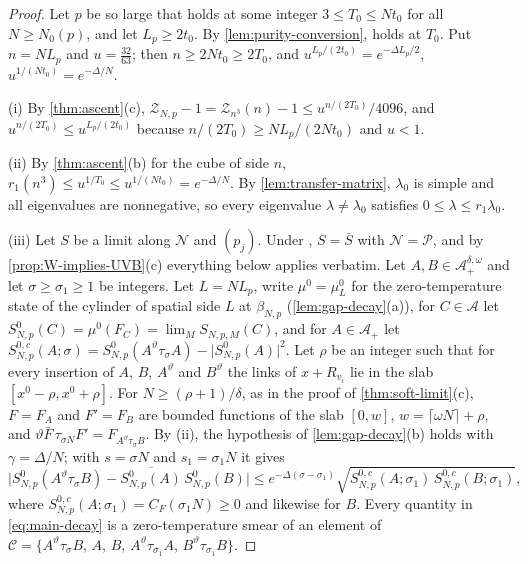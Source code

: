 \documentclass[11pt,a4paper]{amsart}
\theoremstyle{definition}
\theoremstyle{remark}
\numberwithin{equation}{section}
\newcommand{\abs}[1]{\lvert #1\rvert}      %
\newcommand{\TT}{\mathbb{T}}               %
\newcommand{\Zc}{\mathcal{Z}}              %
\newcommand{\Zs}[2]{\Zc_{#1}(#2)}          %
\newcommand{\lzero}{\lambda_0}             %
\newcommand{\Mcirc}{\text{\upshape(M$^{\circ}$)}}   %
\newcommand{\Bcirc}{\text{\upshape(B$^{\circ}$)}}   %
\newcommand{\hypW}{\text{\upshape(W)}}              %
\newcommand{\tzero}{t_0}                   %
\newcommand{\Tzero}{T_0}                   %
\newcommand{\Lp}{L_p}                      %
\newcommand{\betaNp}{\beta_{N,p}}          %
\begin{document}
\begin{proof}
Let $p$ be so large that \Mcirc{} holds at some integer $3\le\Tzero\le N\tzero$ for all $N\ge N_0(p)$, and let $\Lp\ge2\tzero$. By \cref{lem:purity-conversion}, \Bcirc{} holds at $\Tzero$. Put $n=N\Lp$ and $u=\frac{32}{63}$; then $n\ge2N\tzero\ge2\Tzero$, and $u^{\Lp/(2\tzero)}=e^{-\Delta\Lp/2}$, $u^{1/(N\tzero)}=e^{-\Delta/N}$.

(i) By \cref{thm:ascent}(c), $\Zc_{N,p}-1=\Zs{n^3}{n}-1\le u^{n/(2\Tzero)}/4096$, and $u^{n/(2\Tzero)}\le u^{\Lp/(2\tzero)}$ because $n/(2\Tzero)\ge N\Lp/(2N\tzero)$ and $u<1$.

(ii) By \cref{thm:ascent}(b) for the cube of side $n$, $r_1(n^3)\le u^{1/\Tzero}\le u^{1/(N\tzero)}=e^{-\Delta/N}$. By \cref{lem:transfer-matrix}, $\lzero$ is simple and all eigenvalues are nonnegative, so every eigenvalue $\lambda\ne\lzero$ satisfies $0\le\lambda\le r_1\lzero$.

(iii) Let $S$ be a limit along $\mathcal N$ and $(p_j)$. Under \hypW, $S=\bar S$ with $\mathcal N=\mathcal P$, and by \cref{prop:W-implies-UVB}(c) everything below applies verbatim. Let $A,B\in\mathcal A_+^{\delta,\omega}$ and let $\sigma\ge\sigma_1\ge1$ be integers. Let $L=N\Lp$, write $\mu^0=\mu^0_L$ for the zero-temperature state of the cylinder of spatial side $L$ at $\betaNp$ (\cref{lem:gap-decay}(a)), for $C\in\mathcal A$ let $S^0_{N,p}(C)=\mu^0(F_C)=\lim_MS_{N,p,M}(C)$, and for $A\in\mathcal A_+$ let $S^{0,c}_{N,p}(A;\sigma)=S^0_{N,p}(A^\vartheta\tau_\sigma A)-\abs{S^0_{N,p}(A)}^2$. Let $\rho$ be an integer such that for every insertion of $A$, $B$, $A^\vartheta$ and $B^\vartheta$ the links of $x+R_{v_i}$ lie in the slab $[x^0-\rho,x^0+\rho]$. For $N\ge(\rho+1)/\delta$, as in the proof of \cref{thm:soft-limit}(c), $F=F_A$ and $F'=F_B$ are bounded functions of the slab $[0,w]$, $w=\lceil\omega N\rceil+\rho$, and $\vartheta\bar F\,\tau_{\sigma N}F'=F_{A^\vartheta\tau_\sigma B}$. By (ii), the hypothesis of \cref{lem:gap-decay}(b) holds with $\gamma=\Delta/N$; with $s=\sigma N$ and $s_1=\sigma_1N$ it gives
\begin{equation}\label{eq:main-decay}
\bigl\lvert S^0_{N,p}(A^\vartheta\tau_\sigma B)-\overline{S^0_{N,p}(A)}\,S^0_{N,p}(B)\bigr\rvert\le e^{-\Delta(\sigma-\sigma_1)}\sqrt{S^{0,c}_{N,p}(A;\sigma_1)\,S^{0,c}_{N,p}(B;\sigma_1)} ,
\end{equation}
where $S^{0,c}_{N,p}(A;\sigma_1)=C_F(\sigma_1N)\ge0$ and likewise for $B$. Every quantity in \eqref{eq:main-decay} is a zero-temperature smear of an element of $\mathcal C=\{A^\vartheta\tau_\sigma B,\,A,\,B,\,A^\vartheta\tau_{\sigma_1}A,\,B^\vartheta\tau_{\sigma_1}B\}$.


\end{proof}
\end{document}
